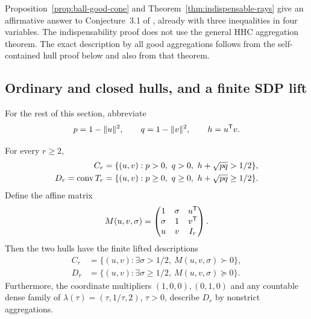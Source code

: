 Proposition~\ref{prop:ball-good-cone} and
Theorem~\ref{thm:indispensable-rays} give an affirmative answer to
Conjecture~3.1 of \citet{BDSpreprint}, already with three inequalities
in four variables. The indispensability proof does not use the general
HHC aggregation theorem. The exact description by all good aggregations
follows from the self-contained hull proof below and also from that
theorem.

\subsection{Ordinary and closed hulls, and a finite SDP lift}

For the rest of this section, abbreviate
\[
 p=1-\|u\|^2,\qquad q=1-\|v\|^2,\qquad h=u^{\mathsf T} v.
\]
\begin{theorem}\label{thm:ball-hulls}
For every $r\geq2$,
\begin{align}
 C_r&=\{(u,v):p>0,\ q>0,\ h+\sqrt{pq}>1/2\},
       \label{eq:ball-open-hull}\\
 D_r=\operatorname{conv} T_r
    &=\{(u,v):p\geq0,\ q\geq0,\ h+\sqrt{pq}\geq1/2\}.
       \label{eq:ball-closed-hull}
\end{align}
Define the affine matrix
\begin{equation}\label{eq:ball-lift-matrix}
 M(u,v,\sigma)=
 \begin{pmatrix}
  1&\sigma&u^{\mathsf T}\\
  \sigma&1&v^{\mathsf T}\\
  u&v&I_r
 \end{pmatrix}.
\end{equation}
Then the two hulls have the finite lifted descriptions
\begin{align}
 C_r&=\{(u,v):\exists\sigma>1/2,\ M(u,v,\sigma)\succ0\},
          \label{eq:ball-strict-lift}\\
 D_r&=\{(u,v):\exists\sigma\geq1/2,\ M(u,v,\sigma)\succeq0\}.
          \label{eq:ball-closed-lift}
\end{align}
Furthermore, the coordinate multipliers $(1,0,0),(0,1,0)$ and
any countable dense family of $\lambda(\tau)=(\tau,1/\tau,2)$,
$\tau>0$, describe $D_r$ by nonstrict aggregations.
\end{theorem}
